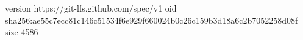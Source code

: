 version https://git-lfs.github.com/spec/v1
oid sha256:ae55c7ecc81c146c51534f6e929f660024b0c26c159b3d18a6c2b7052258d08f
size 4586
